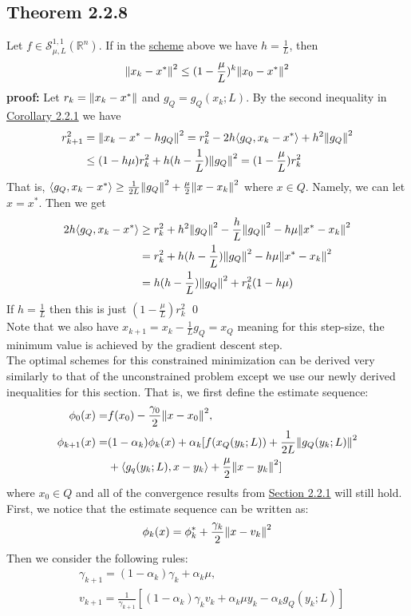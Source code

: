 \documentclass[12pt,a4paper]{article}
\begin{document}
	\subsection*{Theorem 2.2.8}\label{thm228}
	Let $f \in \mathcal{S}_{\mu, L}^{1,1}(\mathbb{R}^n)$. If in the \hyperref[gradss]{scheme} above we have $h = \frac{1}{L}$, then
	\begin{align*}
		\norm{x_k - x^*}^2 \leq (1 - \frac{\mu}{L})^k\norm{x_0 - x^*}^2
	\end{align*}
	\textbf{proof:}
	Let $r_k = \norm{x_k - x^*}$ and $g_Q = g_Q(x_k;L)$. By the second inequality in \hyperref[cor221]{Corollary 2.2.1} we have 
	\begin{align*}
		r_{k+1}^2 &= \norm{x_k - x^* - hg_Q}^2 = r_k^2 - 2h \langle g_Q, x_k - x^* \rangle + h^2\norm{g_Q}^2 \\
		&\leq (1 - h \mu)r_k^2 + h(h - \frac{1}{L})\norm{g_Q}^2 = (1 - \frac{\mu}{L})r_k^2		
	\end{align*}
	That is, $\langle g_Q, x_k - x^* \rangle \geq \frac{1}{2L}\norm{g_Q}^2 + \frac{\mu}{2}\norm{x - x_k}^2$ where $x \in Q$. Namely, we can let $x = x^*$. Then we get
	\begin{align*}
		2h \langle g_Q, x_k - x^* \rangle &\geq r_k^2 + h^2 \norm{g_Q}^2 - \frac{h}{L}\norm{g_Q}^2 - h\mu \norm{x^* - x_k}^2  \\
		&= r_k^2 + h(h - \frac{1}{L}) \norm{g_Q}^2 - h\mu \norm{x^* - x_k}^2 \\
		&= h(h - \frac{1}{L}) \norm{g_Q}^2 + r_k^2(1 - h \mu)
	\end{align*}
	If $h = \frac{1}{L}$ then this is just $(1 - \frac{\mu}{L})r_k^2$ \qed \\
	Note that we also have $x_{k+1} = x_k - \frac{1}{L}g_Q = x_Q$ meaning for this step-size, the minimum value is achieved by the gradient descent step. \\
	The optimal schemes for this constrained minimization can be derived very similarly to that of the unconstrained problem except we use our newly derived inequalities for this section. That is, we first define the estimate sequence:
	\begin{align*}
		\phi_0(x) = &f(x_0) - \frac{\gamma_0}{2}\norm{x - x_0}^2, \\
		\phi_{k+1}(x) = &(1 - \alpha_k)\phi_k(x) + \alpha_k[f(x_Q(y_k;L)) + \frac{1}{2L}\norm{g_Q(y_k;L)}^2 \\
		&+ \langle g_q(y_k;L),x - y_k \rangle + \frac{\mu}{2}\norm{x - y_k}^2]
	\end{align*}
	where $x_0 \in Q$ and all of the convergence results from \hyperref[sec22opt]{Section 2.2.1} will still hold. First, we notice that the estimate sequence can be written as:
	\begin{align*}
		\phi_k(x) = \phi_k^* + \frac{\gamma_k}{2}\norm{x - v_k}^2
	\end{align*}
	Then we consider the following rules:
	\begin{align*}
		&\gamma_{k+1} = (1 - \alpha_k)\gamma_k + \alpha_k\mu, \\
		&v_{k+1} = \frac{1}{\gamma_{k+1}}[(1 - \alpha_k)\gamma_kv_k + \alpha_k\mu y_k - \alpha_k g_Q(y_k;L)] \\
		\end{align*}
		
\end{document}
